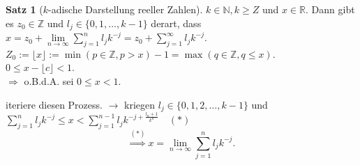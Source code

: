 \documentclass[12pt,a4paper,titlepage]{article} %
\theoremstyle{definition}
\newtheorem{satz}{Satz}[subsection]
\theoremstyle{remark}
\newcommand{\N}{\mathbb{N}}
\newcommand{\Z}{\mathbb{Z}}
\newcommand{\R}{\mathbb{R}}
\newcommand{\limes}[1]{\lim\limits_{#1\rightarrow\infty}}
\begin{document}
\begin{satz}[\(k\)-adische Darstellung reeller Zahlen]
	\(k\in\N, k\geq Z\) und \(x\in\R\). Dann gibt es \(z_0\in \Z\) und \(l_j \in\{0,1,\ldots,k-1\} \) derart, dass \(x = z_0 + \limes{n} \sum_{j=1}^{n} l_j k^{-j} = z_0 + \sum_{j=1}^{\infty} l_j k^{-j} \).\\
	\(Z_0 := \lfloor x \rfloor := \min(p\in\Z, p>x) -1 = \max(q\in\Z, q\leq x). \)\\
	\( 0\leq x-\lfloor c\rfloor <1. \)\\
	\(\Rightarrow\) o.B.d.A. sei \(0\leq x<1\).
	\begin{center}
	\end{center}
	iteriere diesen Prozess.
	\(\rightarrow\) kriegen \(l_j \in \{0,1,2,\ldots,k-1 \} \) und \(\sum_{j=1}^{n} l_j k^{-j} \leq x < \sum_{j=1}^{n-1} l_j k^{-j + \frac{l_n + 1}{k^n}} \quad (*)\)\\
	\[ \overset{(*)}{\Rightarrow} x = \limes{n} \sum_{j=1}^{n} l_j k^{-j}. \]
\end{satz}
\end{document}
